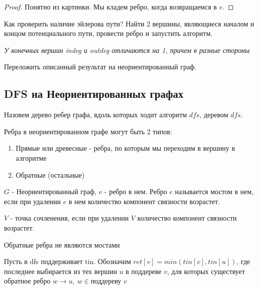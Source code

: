 \begin{proof}
  Понятно из картинки. Мы кладем ребро, когда возвращаемся в $v$.
\end{proof}

\begin{note}
Как проверить наличие эйлерова пути? Найти 2 вершины, являющиеся началом и концом потенциального пути, провести ребро и запустить алгоритм.

\textit{У конечных вершин indeg и outdeg отличаются на 1, причем в разные стороны}
\end{note}

\begin{proposition}
  Переложить описанный результат на неориентированный граф. 
\end{proposition}

\subsection{DFS на Неориентированных графах}

Назовем дерево ребер графа, вдоль которых ходит алгоритм $dfs$, деревом $dfs$. 

\begin{note}
  Ребра в неориентированном графе могут быть 2 типов:
  \begin{enumerate}
    \item Прямые или древесные - ребра, по которым мы переходим в вершину в алгоритме
    \item Обратные (остальные)
  \end{enumerate}
\end{note}

\begin{definition}
  $G$ - Неориентированный граф, $e$ - ребро в нем. Ребро $e$ называется мостом в нем, если при удалении $e$ в нем количество компонент связности возрастет. 
\end{definition}

\begin{definition}
  $V$ - точка сочленения, если при удалении $V$ количество компонент связности возрастет.
\end{definition}

\begin{proposition}
  Обратные ребра не являются мостами
\end{proposition}

Пусть в dfs поддерживает tin. Обозначим $ret[v] = min(tin[v], tin[u])$, где последнее выбирается из тех вершин $u$ в поддереве $v$, для которых существует обратное ребро $w \to u, \ w \in \text{поддереву $v$}$

